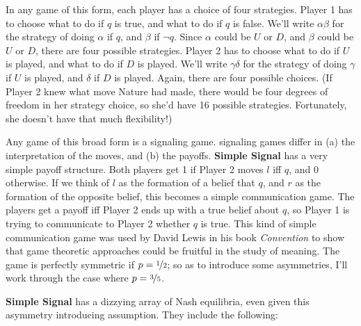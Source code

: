 \documentclass[openany]{book}
\begin{document}
In any game of this form, each player has a choice of four strategies. Player 1 has to choose what to do if $q$ is true, and what to do if $q$ is false. We'll write $\alpha \beta$ for the strategy of doing $\alpha$ if $q$, and $\beta$ if $\neg q$. Since $\alpha$ could be $U$ or $D$, and $\beta$ could be $U$ or $D$, there are four possible strategies. Player 2 has to choose what to do if $U$ is played, and what to do if $D$ is played. We'll write $\gamma \delta$ for the strategy of doing $\gamma$ if $U$ is played, and $\delta$ if $D$ is played. Again, there are four possible choices. (If Player 2 knew what move Nature had made, there would be four degrees of freedom in her strategy choice, so she'd have 16 possible strategies. Fortunately, she doesn't have that much flexibility!)

Any game of this broad form is a signaling game. signaling games differ in (a) the interpretation of the moves, and (b) the payoffs. \textbf{Simple Signal} has a very simple payoff structure. Both players get 1 if Player 2 moves $l$ iff $q$, and 0 otherwise. If we think of $l$ as the formation of a belief that $q$, and $r$ as the formation of the opposite belief, this becomes a simple communication game. The players get a payoff iff Player 2 ends up with a true belief about $q$, so Player 1 is trying to communicate to Player 2 whether $q$ is true. This kind of simple communication game was used by David Lewis in his book \textit{Convention} to show that game theoretic approaches could be fruitful in the study of meaning. The game is perfectly symmetric if $p = \nicefrac{1}{2}$; so as to introduce some asymmetries, I'll work through the case where $p = \nicefrac{3}{5}$.

\textbf{Simple Signal} has a dizzying array of Nash equilibria, even given this asymmetry introducing assumption. They include the following:
\end{document}

